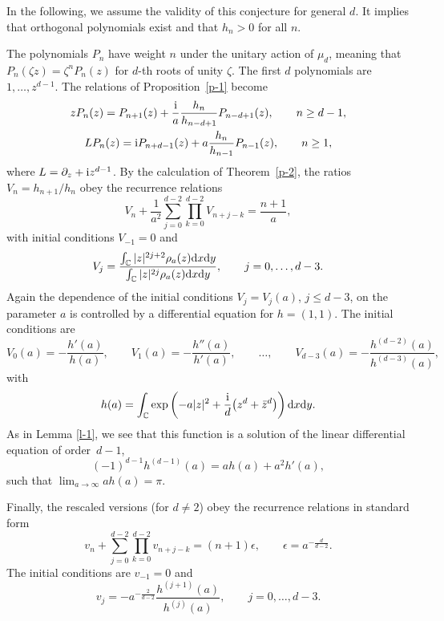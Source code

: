 \documentclass[pdftex]{sigma}
\numberwithin{equation}{section}
\theoremstyle{definition}
\begin{document}
In the following, we assume the validity of this conjecture for general $d$. It implies that orthogonal polynomials exist and that $h_n>0$ for all $n$.

The polynomials $P_n$ have weight $n$ under the unitary action of $\mu_d$, meaning that $P_n(\zeta z)=\zeta^nP_n(z)$ for $d$-th roots of unity $\zeta$. The first $d$ polynomials are $1,\dots,z^{d-1}$.
The relations of Proposition~\ref{p-1} become
\begin{gather}\label{e-rec1}
 zP_n(z) = P_{n+1}(z)+\frac{\rm i}{a}\frac{h_n}{h_{n-d+1}}P_{n-d+1}(z),\qquad n\geq d-1,
 \\
 LP_n(z) = {\rm i} P_{n+d-1}(z)+a\frac{h_n}{h_{n-1}}P_{n-1}(z),\qquad n\geq1, \label{e-rec2}
\end{gather}
where $L=\partial_z+{\rm i}z^{d-1}$.
By the calculation of Theorem~\ref{p-2}, the ratios $V_n=h_{n+1}/h_n$ obey the recurrence relations
\begin{equation}\label{e-3}
V_n+\frac{1}{a^2}\sum_{j=0}^{d-2}\prod_{k=0}^{d-2}V_{n+j-k}=\frac{n+1}a,
\end{equation}
with initial conditions $V_{-1}=0$ and
\[
V_j=\frac{\int_{\mathbb C}|z|^{2j+2}\rho_{a}(z){\rm d}x{\rm d}y}{\int_{\mathbb C}|z|^{2j}\rho_{a}(z){\rm d}x{\rm d}y},\qquad j=0,\dots, d-3.
\]
Again the dependence of the initial conditions $V_j=V_j(a)$, $j\leq d-3$, on the parameter $a$ is controlled by a differential equation for $h=(1,1)$. The initial conditions are
\[
V_0(a)=-\frac{h'(a)}{h(a)},\qquad V_1(a)=-\frac{h''(a)}{h'(a)},\qquad \dots,\qquad
V_{d-3}(a)=-\frac{h^{(d-2)}(a)}{h^{(d-3)}(a)},
\]
with
\begin{equation}\label{e-h}
h(a)=\int_{\mathbb C}\exp\left(-a|z|^2+\frac {\rm i}d\bigl(z^d+\bar z^d\bigr)\right){\rm d}x{\rm d}y.
\end{equation}
As in Lemma \ref{l-1}, we see that this function is a solution of the linear differential equation of order~${d-1}$,
\begin{equation}\label{e-4}
(-1)^{d-1}h^{(d-1)}(a)=ah(a)+a^2h'(a),
\end{equation}
such that $\lim_{a\to \infty}ah(a)=\pi$.

Finally, the rescaled versions (for $d\neq2$)
obey the recurrence relations in standard form \cite{AHK2019,CornalbaTaylor1999, Hoppe2025}
\[
v_n+\sum_{j=0}^{d-2}\prod_{k=0}^{d-2}v_{n+j-k}=(n+1)\epsilon, \qquad \epsilon=a^{{-\frac d{d-2}}}.
\]
The initial conditions are $v_{-1}=0$ and
\[
v_j=-a^{{-\frac{2}{d-2}}}\frac{h^{(j+1)}(a)}{h^{(j)}(a)},\qquad j=0,\dots,d-3.
\]
\end{document}
